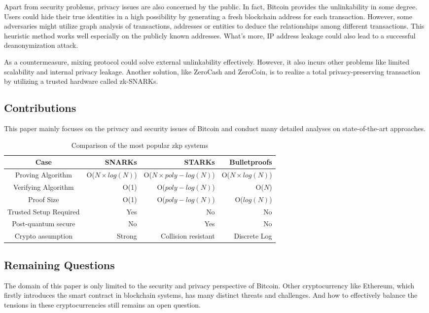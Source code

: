\documentclass[conference]{IEEEtran}
\begin{document}
Apart from security problems, privacy issues are also concerned by the public.
%
In fact, Bitcoin provides the unlinkability in some degree.
%
Users could hide their true identities in a high possibility by generating a fresh blockchain address for each transaction.
%
However, some adversaries might utilize graph analysis of transactions, addresses or entities to deduce the relationships among different transactions.
%
This heuristic method works well especially on the publicly known addresses.
%
What's more, IP address leakage could also lead to a successful deanonymization attack.

As a countermeasure, mixing protocol could solve external unlinkability effectively.
%
However, it also incurs other problems like limited scalability and internal privacy leakage.
%
Another solution, like ZeroCash and ZeroCoin, is to realize a total privacy-preserving transaction by utilizing a trusted hardware called zk-SNARKs. 

\subsection{Contributions}
This paper mainly focuses on the privacy and security issues of Bitcoin and conduct many detailed analyses on state-of-the-art approaches.

\begin{table*}[!t]
    \caption{Comparison of the most popular zkp systems}
    \centering
    \begin{tabular}{c rrr}
        \hline \hline
        Case & SNARKs & STARKs & Bulletproofs \\
        \hline
        Proving Algorithm & O($N {\times} log(N)$) & O($N {\times} poly{-}log(N)$) & O($N {\times} log(N)$) \\
        Verifying Algorithm & O(1) & O($poly{-}log(N)$) & O($N$) \\
        Proof Size & O(1) & O($poly{-}log(N)$) & O($log(N)$) \\
        Trusted Setup Required & Yes & No & No \\
        Post-quantum secure & No & Yes & No \\
        Crypto assumption & Strong & Collision resistant & Discrete Log \\
        \hline
    \end{tabular}
    \label{compare}
\end{table*}

\subsection{Remaining Questions}
The domain of this paper is only limited to the security and privacy perspective of Bitcoin.
%
Other cryptocurrency like Ethereum, which firstly introduces the smart contract in blockchain systems, has many distinct threats and challenges.
%
And how to effectively balance the tensions in these cryptocurrencies still remains an open question.
\end{document}
